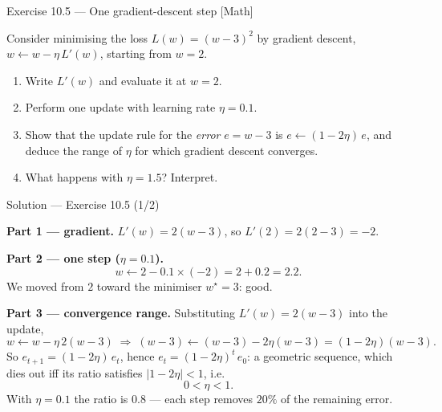 \documentclass[aspectratio=169,11pt]{beamer}
\begin{document}
\begin{frame}{Exercise 10.5 --- One gradient-descent step [Math]}
\begin{exercise}
  Consider minimising the loss $L(w) = (w - 3)^2$ by gradient
  descent, $w \leftarrow w - \eta\, L'(w)$, starting from $w = 2$.
  \begin{enumerate}
    \item Write $L'(w)$ and evaluate it at $w = 2$.
    \item Perform one update with learning rate $\eta = 0.1$.
    \item Show that the update rule for the \emph{error} $e = w - 3$
          is $e \leftarrow (1 - 2\eta)\,e$, and deduce the range of
          $\eta$ for which gradient descent converges.
    \item What happens with $\eta = 1.5$? Interpret.
  \end{enumerate}
\end{exercise}
\end{frame}

\begin{frame}{Solution --- Exercise 10.5 (1/2)}
\begin{solutionbox}
  \textbf{Part 1 --- gradient.}
  $L'(w) = 2(w - 3)$, so $L'(2) = 2(2 - 3) = -2$.

  \medskip
  \textbf{Part 2 --- one step ($\eta = 0.1$).}
  \[
    w \leftarrow 2 - 0.1 \times (-2) = 2 + 0.2 = 2.2 .
  \]
  We moved from $2$ toward the minimiser $w^\star = 3$: good.

  \medskip
  \textbf{Part 3 --- convergence range.} Substituting $L'(w) = 2(w-3)$
  into the update,
  \[
    w \leftarrow w - \eta\, 2(w - 3)
    \;\Longrightarrow\;
    (w - 3) \leftarrow (w - 3) - 2\eta (w - 3) = (1 - 2\eta)(w - 3).
  \]
  So $e_{t+1} = (1 - 2\eta)\, e_t$, hence $e_t = (1 - 2\eta)^t\, e_0$: a
  geometric sequence, which dies out iff its ratio satisfies
  $|1 - 2\eta| < 1$, i.e.
  \[
    0 < \eta < 1 .
  \]
  With $\eta = 0.1$ the ratio is $0.8$ --- each step removes $20\%$ of the
  remaining error.
\end{solutionbox}
\end{frame}
\end{document}
